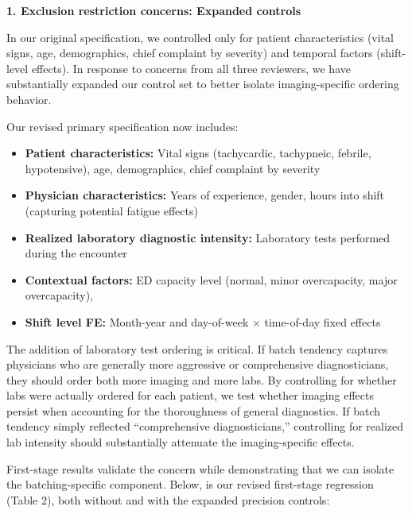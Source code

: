 \documentclass[11pt]{article}
\newcommand{\1}{\hbox{\rm 1\kern-.35em 1}}
\begin{document}
\textbf{1. Exclusion restriction concerns: Expanded controls}

In our original specification, we controlled only for patient characteristics (vital signs, age, demographics, chief complaint by severity) and temporal factors (shift-level effects). In response to concerns from all three reviewers, we have substantially expanded our control set to better isolate imaging-specific ordering behavior.

Our revised primary specification now includes:

\begin{itemize}
\item \textbf{Patient characteristics:} Vital signs (tachycardic, tachypneic, febrile, hypotensive), age, demographics, chief complaint by severity
\item \textbf{Physician characteristics:} Years of experience, gender, hours into shift (capturing potential fatigue effects)
\item \textbf{Realized laboratory diagnostic intensity:} Laboratory tests performed during the encounter
\item \textbf{Contextual factors:} ED capacity level (normal, minor overcapacity, major overcapacity),
\item \textbf{Shift level FE:} Month-year and day-of-week $\times$ time-of-day fixed effects
\end{itemize}

The addition of laboratory test ordering is critical. If batch tendency captures physicians who are generally more aggressive or comprehensive diagnosticians, they should order both more imaging and more labs. By controlling for whether labs were actually ordered for each patient, we test whether imaging effects persist when accounting for the thoroughness of general diagnostics. If batch tendency simply reflected ``comprehensive diagnosticians,'' controlling for realized lab intensity should substantially attenuate the imaging-specific effects.

First-stage results validate the concern while demonstrating that we can isolate the batching-specific component. Below, is our revised first-stage regression (Table 2), both without and with the expanded precision controls:
\end{document}
